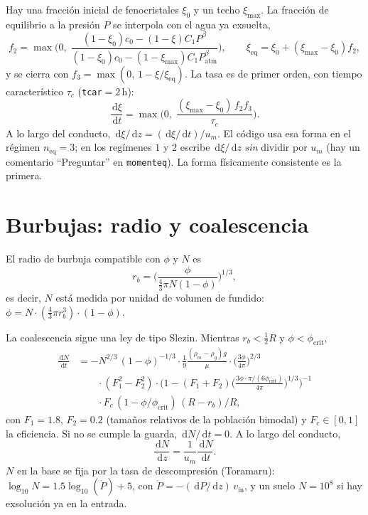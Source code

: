 \documentclass[11pt,a4paper]{article}
\newcommand{\dd}{\,\mathrm{d}}
\begin{document}
Hay una fracción inicial de fenocristales $\xi_0$ y un techo
$\xi_{\max}$. La fracción de equilibrio a la presión $P$ se interpola
con el agua ya exsuelta,
\begin{equation}
\label{eq:xteo}
f_2=\max\Biggl(0,\;
\frac{(1-\xi_0)c_0-(1-\xi)C_1 P^\beta}
{(1-\xi_0)c_0-(1-\xi_{\max})C_1 P_{\mathrm{atm}}^\beta}\Biggr),
\qquad
\xi_{\mathrm{eq}}
=\xi_0+(\xi_{\max}-\xi_0)f_2,
\end{equation}
y se cierra con $f_3=\max(0,\,1-\xi/\xi_{\mathrm{eq}})$. La tasa es
de primer orden, con tiempo característico $\tau_c$
(\texttt{tcar}${}=2\,\mathrm{h}$):
\begin{equation}
\label{eq:dxdt}
\frac{\dd\xi}{\dd t}
=\max\Biggl(0,\;
\frac{(\xi_{\max}-\xi_0)\,f_2 f_3}{\tau_c}\Biggr).
\end{equation}
A lo largo del conducto, $\dd\xi/\dd z=(\dd\xi/\dd t)/u_m$. El código
usa esa forma en el régimen $n_{\mathrm{eq}}=3$; en los regímenes
$1$ y $2$ escribe $\dd\xi/\dd z$ \emph{sin} dividir por $u_m$ (hay un
comentario ``Preguntar'' en \texttt{momenteq}). La forma
físicamente consistente es la primera.

\section{Burbujas: radio y coalescencia}

El radio de burbuja compatible con $\phi$ y $N$ es
\begin{equation}
\label{eq:rb}
r_b
=\Biggl(\frac{\phi}{\tfrac43\pi N(1-\phi)}\Biggr)^{1/3},
\end{equation}
es decir, $N$ está medida por unidad de volumen de fundido:
$\phi=N\cdot(\tfrac43\pi r_b^3)\cdot(1-\phi)$.

La coalescencia sigue una ley de tipo Slezin. Mientras
$r_b<\tfrac12 R$ y $\phi<\phi_{\mathrm{crit}}$,
\begin{equation}
\label{eq:dNdt}
\begin{aligned}
\frac{\dd N}{\dd t}
&=-N^{2/3}\,(1-\phi)^{-1/3}
\cdot\frac19\frac{(\rho_m-\rho_g)g}{\mu}
\cdot\Biggl(\frac{3\phi}{4\pi}\Biggr)^{2/3}\\
&\qquad\cdot(F_1^2-F_2^2)
\cdot\Biggl(1-(F_1+F_2)
\Biggl(\frac{3\phi\cdot\pi/(6\phi_{\mathrm{crit}})}{4\pi}\Biggr)^{1/3}\Biggr)^{-1}\\
&\qquad\cdot F_c\,(1-\phi/\phi_{\mathrm{crit}})\,(R-r_b)/R,
\end{aligned}
\end{equation}
con $F_1=1.8$, $F_2=0.2$ (tamaños relativos de la población bimodal)
y $F_c\in[0,1]$ la eficiencia. Si no se cumple la guarda,
$\dd N/\dd t=0$. A lo largo del conducto,
\begin{equation}
\frac{\dd N}{\dd z}=\frac{1}{u_m}\frac{\dd N}{\dd t}.
\end{equation}
$N$ en la base se fija por la tasa de descompresión (Toramaru):
$\log_{10}N=1.5\log_{10}(\dot P)+5$, con
$\dot P=-(\dd P/\dd z)\,v_{\mathrm{in}}$, y un suelo $N=10^8$ si hay
exsolución ya en la entrada.
\end{document}

